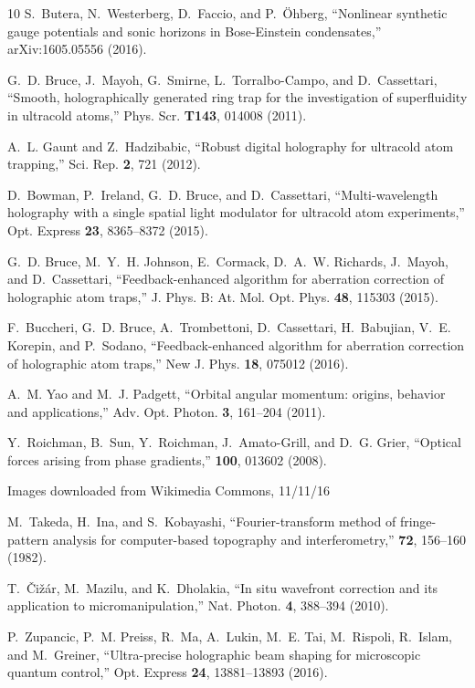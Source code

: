 \documentclass[amsmath,onecolumn,superscriptaddress,notitlepage]{revtex4-1}
\begin{document}
\begin{thebibliography}{10}
S.~Butera, N.~Westerberg, D.~Faccio, and P.~\"{O}hberg, \enquote{Nonlinear
  synthetic gauge potentials and sonic horizons in Bose-Einstein condensates,}
  arXiv:1605.05556  (2016).

G.~D. Bruce, J.~Mayoh, G.~Smirne, L.~Torralbo-Campo, and D.~Cassettari,
  \enquote{Smooth, holographically generated ring trap for the investigation of
  superfluidity in ultracold atoms,} Phys. Scr. \textbf{T143}, 014008 (2011).

A.~L. Gaunt and Z.~Hadzibabic, \enquote{Robust digital holography for ultracold
  atom trapping,} Sci. Rep. \textbf{2}, 721 (2012).

D.~Bowman, P.~Ireland, G.~D. Bruce, and D.~Cassettari,
  \enquote{Multi-wavelength holography with a single spatial light modulator
  for ultracold atom experiments,} Opt. Express \textbf{23}, 8365--8372 (2015).

G.~D. Bruce, M.~Y.~H. Johnson, E.~Cormack, D.~A.~W. Richards, J.~Mayoh, and
  D.~Cassettari, \enquote{Feedback-enhanced algorithm for aberration correction
  of holographic atom traps,} J. Phys. B: At. Mol. Opt. Phys. \textbf{48},
  115303 (2015).

F.~Buccheri, G.~D. Bruce, A.~Trombettoni, D.~Cassettari, H.~Babujian, V.~E.
  Korepin, and P.~Sodano, \enquote{Feedback-enhanced algorithm for aberration
  correction of holographic atom traps,} New J. Phys. \textbf{18}, 075012
  (2016).

A.~M. Yao and M.~J. Padgett, \enquote{Orbital angular momentum: origins,
  behavior and applications,} Adv. Opt. Photon. \textbf{3}, 161--204 (2011).

Y.~Roichman, B.~Sun, Y.~Roichman, J.~Amato-Grill, and D.~G. Grier,
  \enquote{Optical forces arising from phase gradients,} \prl
  \textbf{100}, 013602 (2008).
  
  Images downloaded from Wikimedia Commons, 11/11/16

M.~Takeda, H.~Ina, and S.~Kobayashi, \enquote{Fourier-transform method of
  fringe-pattern analysis for computer-based topography and interferometry,} \josa \textbf{72}, 156--160 (1982).

T.~\v{C}i\v{z}\'{a}r, M.~Mazilu, and K.~Dholakia, \enquote{In situ wavefront
  correction and its application to micromanipulation,} Nat. Photon.
  \textbf{4}, 388--394 (2010).

P.~Zupancic, P.~M. Preiss, R.~Ma, A.~Lukin, M.~E. Tai, M.~Rispoli, R.~Islam,
  and M.~Greiner, \enquote{Ultra-precise holographic beam shaping for
  microscopic quantum control,} Opt. Express \textbf{24}, 13881--13893 (2016).

\end{thebibliography}
\end{document}
